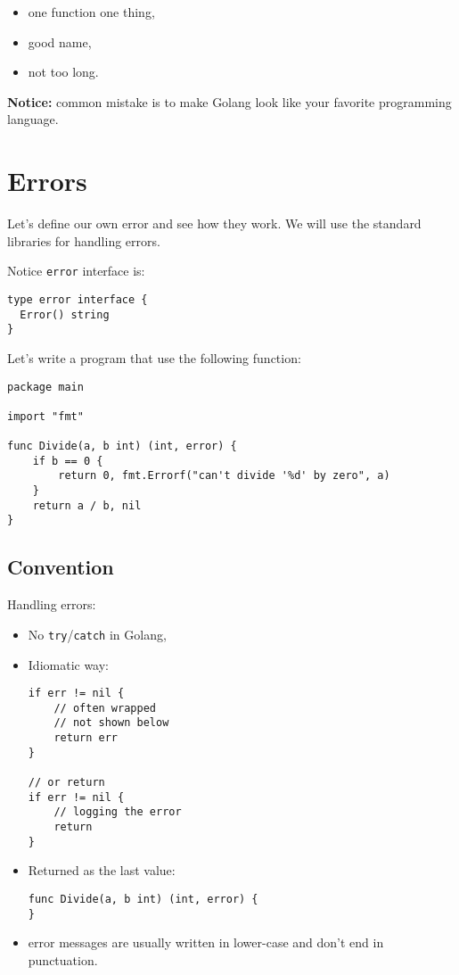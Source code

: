 \documentclass[11pt, letterpaper]{article}
\begin{document}
\begin{itemize}%
\item one function one thing,
\item good name,
\item not too long.
\end{itemize}%

\bigskip
\textbf{Notice:} common mistake is to make Golang look like your favorite programming language.

\section{Errors}
Let's define our own error and see how they work. We will use the standard libraries for handling errors.

Notice \verb|error| interface is:

\begin{verbatim}
type error interface {
  Error() string
}
\end{verbatim}

Let's write a program that use the following function:

\begin{verbatim}
package main

import "fmt"

func Divide(a, b int) (int, error) {
    if b == 0 {
        return 0, fmt.Errorf("can't divide '%d' by zero", a)
    }
    return a / b, nil
}
\end{verbatim}

\subsection{Convention}

Handling errors:

\begin{itemize}%
\item No \verb|try|/\verb|catch| in Golang,
\item Idiomatic way: \begin{verbatim}
if err != nil {
	// often wrapped
	// not shown below
	return err
}

// or return
if err != nil {
	// logging the error
	return
}
\end{verbatim}
\item Returned as the last value: \begin{verbatim}
func Divide(a, b int) (int, error) {
}
\end{verbatim}
\item error messages are usually written in lower-case and don’t end in punctuation.
\end{itemize}
\end{document}
